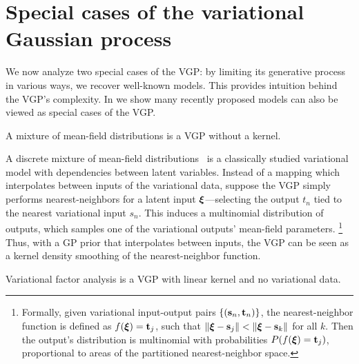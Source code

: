 
\section{Special cases of the variational Gaussian process}
\label{appendix:special}


We now analyze two special cases of the \gls{VGP}: by limiting its
generative process in various ways, we recover well-known models.
This
provides intuition behind the \gls{VGP}'s complexity.  In
 we show many recently proposed models can
also be viewed as special cases of the \gls{VGP}.

\begin{example}
A mixture of mean-field distributions is a \gls{VGP} without a
kernel.
\end{example}

A discrete mixture of mean-field
distributions~\citep{bishop1998approximating,jaakola1998improving,lawrence2000variational}
is a classically studied variational model
with dependencies between latent variables.
Instead of a mapping which interpolates between
inputs of the variational data,
suppose the \gls{VGP}
simply performs nearest-neighbors for a latent input
$\boldsymbol{\mathbf{\xi}}$---selecting
the output $t_n$ tied to the nearest variational input $s_n$.
This induces a multinomial distribution of outputs, which samples one
of the variational outputs' mean-field parameters.%
\footnote{%
Formally, given variational input-output pairs $\{(\mathbf{s}_n,\mathbf{t}_n)\}$,
the nearest-neighbor function is defined
as $f(\boldsymbol{\mathbf{\xi}})=\mathbf{t}_j$, such that
$\|\boldsymbol{\mathbf{\xi}}- \mathbf{s}_j\|<\|\boldsymbol{\mathbf{\xi}}- \mathbf{s}_k\|$ for all $k$.
Then the output's distribution is multinomial with
probabilities $P(f(\boldsymbol{\mathbf{\xi}})=\mathbf{t}_j)$, proportional to areas of the
partitioned nearest-neighbor space.
}
Thus, with a \gls{GP} prior that interpolates between
inputs, the \gls{VGP} can be seen as a kernel density smoothing of the
nearest-neighbor function.

\begin{example}
Variational factor analysis is
a \gls{VGP} with linear kernel and no variational data.
\end{example}

